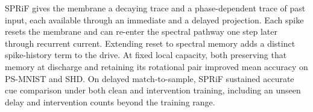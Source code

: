 \documentclass[letterpaper,journal]{IEEEtran}
\begin{document}
SPRiF gives the membrane a decaying trace and a phase-dependent trace of past input, each available through an immediate and a delayed projection. Each spike resets the membrane and can re-enter the spectral pathway one step later through recurrent current. Extending reset to spectral memory adds a distinct spike-history term to the drive. At fixed local capacity, both preserving that memory at discharge and retaining its rotational pair improved mean accuracy on PS-MNIST and SHD. On delayed match-to-sample, SPRiF sustained accurate cue comparison under both clean and intervention training, including an unseen delay and intervention counts beyond the training range.



\end{document}
